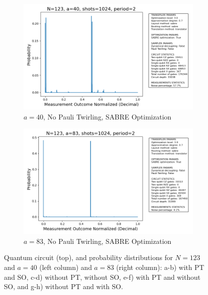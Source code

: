 \documentclass[conference,twoside]{IEEEtran}
\begin{document}
\begin{figure}[!htbp]
    \begin{subfigure}{0.37\textwidth}
        \centering
        \includegraphics[width=\textwidth]{prob_dist_N123_a40_backend_ibmqpu_PT0_SO1.png}
        \caption{$a=40$, No Pauli Twirling, SABRE Optimization}
    \end{subfigure}
    \hfill
    \begin{subfigure}{0.37\textwidth}
        \centering
        \includegraphics[width=\textwidth]{prob_dist_N123_a83_backend_ibmqpu_PT0_SO1.png}
        \caption{$a=83$, No Pauli Twirling, SABRE Optimization}
    \end{subfigure}

    \caption{Quantum circuit (top), and probability distributions for $N=123$ and $a=40$ (left column) and $a=83$ (right column): a-b) with PT and SO, c-d) without PT, without SO, e-f) with PT and without SO, and g-h) without PT and with SO.}
    \label{fig:Factoring_N=123}
\end{figure}
\end{document}

